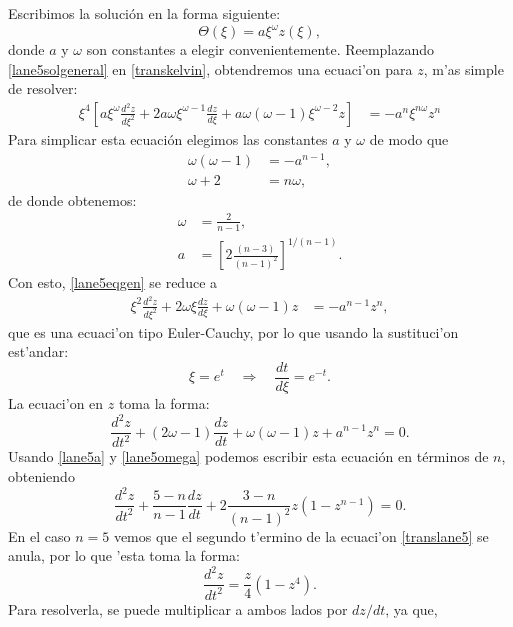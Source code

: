Escribimos la solución en la forma siguiente:
\begin{equation}\label{lane5solgeneral}
 \Theta(\xi)=a\xi^{\omega}z(\xi),
\end{equation}
donde $a$ y $\omega$ son constantes a elegir convenientemente. Reemplazando \eqref{lane5solgeneral} en \eqref{transkelvin}, obtendremos una ecuaci'on  para $z$, m'as simple de resolver:
\begin{align}\label{lane5eqgen}
 \xi^4\left[a\xi^{\omega}\frac{d^2 z}{d\xi^2}+2a\omega\xi^{\omega-1}\frac{dz}{d\xi}+a\omega(\omega-1)\xi^{\omega-2}z\right]&=-a^{n}\xi^{n\omega}z^n
 \end{align}
 Para simplicar esta ecuación elegimos las constantes $a$ y $\omega$ de modo que
\begin{align}
\omega(\omega-1)&=-a^{n-1},\label{lane5a}\\
\omega+2&=n\omega,
\end{align}
de donde obtenemos:
\begin{align}
\omega&=\frac{2}{n-1} \label{lane5omega},\\
a&=\left[2\frac{(n-3)}{(n-1)^2}\right]^{1/(n-1)}\label{lane5a2}.
\end{align}
Con esto, \eqref{lane5eqgen} se reduce a 
\begin{align}
\xi^2\frac{d^2 z}{d\xi^2}+2\omega\xi\frac{dz}{d\xi}+\omega(\omega-1)z&=-a^{n-1}z^n,
\end{align}
que es una ecuaci'on tipo Euler-Cauchy, por lo que usando la sustituci'on est'andar:
\begin{equation}\label{euler-sust}
 \xi=e^{t}\quad\Rightarrow\quad \frac{dt}{d\xi}=e^{-t}.
\end{equation}
La ecuaci'on en $z$ toma la forma:
\begin{equation}
 \frac{d^2 z}{dt^2}+(2\omega-1)\frac{dz}{dt}+\omega(\omega-1)z+a^{n-1}z^n=0.
\end{equation}
Usando \eqref{lane5a} y \eqref{lane5omega} podemos escribir esta ecuación en términos de $n$, obteniendo
\begin{equation}\label{translane5}
 \frac{d^2 z}{dt^2}+\frac{5-n}{n-1}\frac{dz}{dt}+2\frac{3-n}{(n-1)^2}z(1-z^{n-1})=0.
\end{equation}
En el caso $n=5$ vemos que el segundo t'ermino de la ecuaci'on \eqref{translane5} se anula, por lo que 'esta toma la forma:
\begin{equation}\label{translane5b}
 \frac{d^2 z}{dt^2}=\frac{z}{4}(1-z^4).
\end{equation}
Para resolverla, se puede multiplicar a ambos lados por $dz/dt$, ya que,

